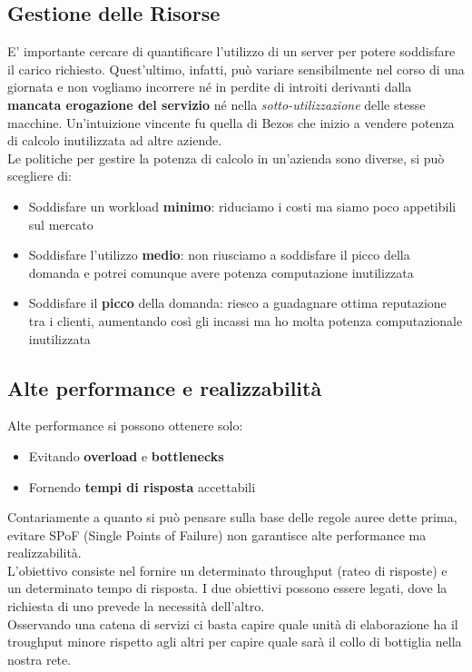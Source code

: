 \documentclass{article}
\begin{document}
		\subsection{Gestione delle Risorse}
		E' importante cercare di quantificare l'utilizzo di un server per potere soddisfare il carico richiesto. Quest'ultimo, infatti, può variare sensibilmente nel corso di una giornata e non vogliamo incorrere né in perdite di introiti derivanti dalla \textbf{mancata erogazione del servizio} né nella \textit{sotto-utilizzazione} delle stesse macchine. Un'intuizione vincente fu quella di Bezos che inizio a vendere potenza di calcolo inutilizzata ad altre aziende.\\
		
		Le politiche per gestire la potenza di calcolo in un'azienda sono diverse, si può scegliere di:
		\begin{itemize}
		    \item Soddisfare un workload \textbf{minimo}: riduciamo i costi ma siamo poco appetibili sul mercato
		    \item Soddisfare l'utilizzo \textbf{medio}: non riusciamo a soddisfare il picco della domanda e potrei comunque avere potenza computazione inutilizzata
		    \item Soddisfare il \textbf{picco} della domanda: riesco a guadagnare ottima reputazione tra i clienti, aumentando così gli incassi ma ho molta potenza computazionale inutilizzata
		\end{itemize}
		
		\subsection{Alte performance e realizzabilità}
		Alte performance si possono ottenere solo:
		\begin{itemize}
		    \item Evitando \textbf{overload} e \textbf{bottlenecks}
		    \item Fornendo \textbf{tempi di risposta} accettabili
		\end{itemize}
		Contariamente a quanto si può pensare sulla base delle regole auree dette prima, evitare SPoF (Single Points of Failure) non garantisce alte performance ma realizzabilità.\\
		
		L'obiettivo consiste nel fornire un determinato throughput (rateo di risposte) e un determinato tempo di risposta. I due obiettivi possono essere legati, dove la richiesta di uno prevede la necessità dell'altro.\\
		Osservando una catena di servizi ci basta capire quale unità di elaborazione ha il troughput minore rispetto agli altri per capire quale sarà il collo di bottiglia nella nostra rete.
		
\end{document}
